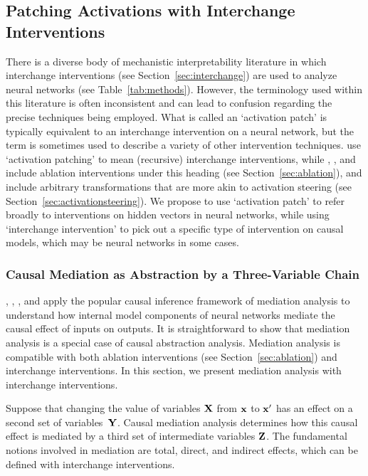 \documentclass[twoside,11pt]{article}
\begin{document}
\subsection{Patching Activations with Interchange Interventions}\label{sec:abstractionwithinterchange}
There is a diverse body of mechanistic interpretability literature in which interchange interventions (see Section~\ref{sec:interchange}) are used to analyze neural networks (see Table~\ref{tab:methods}). However, the terminology used within this literature is often inconsistent and can lead to confusion regarding the precise techniques being employed. What is called an `activation patch' is typically equivalent to an interchange intervention on a neural network, but the term is sometimes used to describe a variety of other intervention techniques. \cite{wang2023interpretability} use `activation patching' to mean (recursive) interchange interventions, while \cite{automated_discovery}, \citet{zhang2024towards}, and \cite{heimersheim2024use} include ablation interventions under this heading (see Section~\ref{sec:ablation}), and \cite{patchscope} include arbitrary transformations that are more akin to activation steering (see Section~\ref{sec:activationsteering}). We propose to use `activation patch' to refer broadly to interventions on hidden vectors in neural networks, while using `interchange intervention' to pick out a specific type of intervention on causal models, which may be neural networks in some cases.



\subsubsection{Causal Mediation as Abstraction by a Three-Variable Chain} \label{sec:mediation}
\cite{vig2020causal},  \cite{finlayson-etal-2021-causal}, \cite{Meng:2022}, and \cite{Stolfo23} apply the popular causal inference framework of mediation analysis \citep{mediation1, mediation2} to understand how internal model components of neural networks mediate the causal effect of inputs on outputs. It is straightforward to show that mediation analysis is a special case of causal abstraction analysis. Mediation analysis is compatible with both ablation interventions (see Section~\ref{sec:ablation}) and interchange interventions. In this section, we present mediation analysis with interchange interventions.

Suppose that changing the value of variables $\mathbf{X}$ from $\mathbf{x}$ to $\mathbf{x}'$ has an effect on a second set of variables~$\mathbf{Y}$. Causal mediation analysis determines how this causal effect is mediated by a third set of intermediate variables $\mathbf{Z}$. The fundamental notions involved in mediation are total, direct, and indirect effects, which can be defined with interchange interventions.
\end{document}
